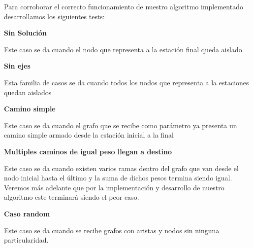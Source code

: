 \indent Para corroborar el correcto funcionamiento de nuestro algoritmo implementado desarrollamos los siguientes tests:\\


\begin{center}
 \textbf{Sin Soluci\'on}
\end{center}

Este caso se da cuando el nodo que representa a la estaci\'on final queda aislado  \\


\begin{center}
 \textbf{Sin ejes}
\end{center}

Esta familia de casos se da cuando todos los nodos que representa a la estaciones quedan aislados  \\

\begin{center}
 \textbf{Camino simple}
\end{center}

Este caso se da cuando el grafo que se recibe como par\'ametro ya presenta un camino simple armado desde la estaci\'on inicial a la final

\begin{center}
 \textbf{Multiples caminos de igual peso llegan a destino}
\end{center}

Este caso se da cuando existen varios ramas dentro del grafo que van desde el nodo inicial hasta el \'ultimo y la suma de dichos pesos termina siendo igual. Veremos m\'as adelante que por la implementaci\'on y desarrollo de nuestro algoritmo este terminar\'a siendo el peor caso.

\begin{center}
 \textbf{Caso random}
\end{center}

Este caso se da cuando se recibe grafos con aristas y nodos sin ninguna particularidad.

